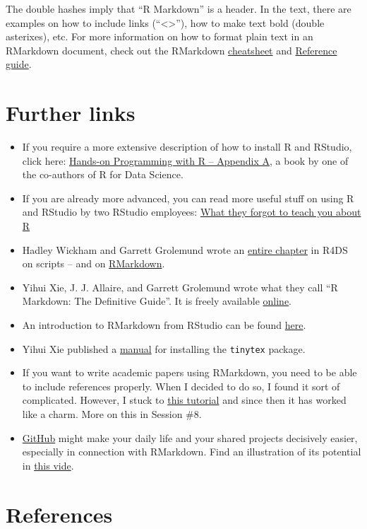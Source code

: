 \documentclass[
]{book}
\providecommand{\tightlist}{%
  \setlength{\itemsep}{0pt}\setlength{\parskip}{0pt}}
\begin{document}
The double hashes imply that ``R Markdown'' is a header. In the text, there are examples on how to include links (``\textless\textgreater{}''), how to make text bold (double asterixes), etc. For more information on how to format plain text in an RMarkdown document, check out the RMarkdown \href{https://rstudio.com/wp-content/uploads/2016/03/rmarkdown-cheatsheet-2.0.pdf?_ga=2.261726157.1753636382.1588487988-401398042.1588487988}{cheatsheet} and \href{https://rstudio.com/wp-content/uploads/2015/03/rmarkdown-reference.pdf?_ga=2.261726157.1753636382.1588487988-401398042.1588487988}{Reference guide}.

\hypertarget{further-links-1}{%
\section{Further links}\label{further-links-1}}

\begin{itemize}
\tightlist
\item
  If you require a more extensive description of how to install R and RStudio, click here: \href{https://rstudio-education.github.io/hopr/starting.html}{Hands-on Programming with R -- Appendix A}, a book by one of the co-authors of R for Data Science.
\item
  If you are already more advanced, you can read more useful stuff on using R and RStudio by two RStudio employees: \href{https://rstats.wtf/index.html}{What they forgot to teach you about R}
\item
  Hadley Wickham and Garrett Grolemund wrote an \href{https://r4ds.had.co.nz/workflow-scripts.html}{entire chapter} in R4DS on scripts -- and on \href{https://r4ds.had.co.nz/r-markdown.html}{RMarkdown}.\\
\item
  Yihui Xie, J. J. Allaire, and Garrett Grolemund wrote what they call ``R Markdown: The Definitive Guide''. It is freely available \href{https://bookdown.org/yihui/rmarkdown/}{online}.\\
\item
  An introduction to RMarkdown from RStudio can be found \href{https://rmarkdown.rstudio.com/lesson-1.html}{here}.\\
\item
  Yihui Xie published a \href{https://yihui.org/tinytex/}{manual} for installing the \texttt{tinytex} package.\\
\item
  If you want to write academic papers using RMarkdown, you need to be able to include references properly. When I decided to do so, I found it sort of complicated. However, I stuck to \href{https://ikashnitsky.github.io/2019/zotero/}{this tutorial} and since then it has worked like a charm. More on this in Session \#8.
\item
  \href{www.github.com}{GitHub} might make your daily life and your shared projects decisively easier, especially in connection with RMarkdown. Find an illustration of its potential in \href{https://www.youtube.com/watch?v=s3JldKoA0zw}{this vide}.
\end{itemize}

\hypertarget{references-1}{%
\section{References}\label{references-1}}

  
\end{document}
